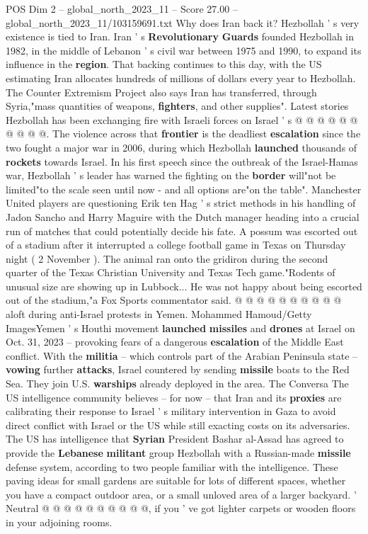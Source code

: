 \begin{textsample}{POS Dim 2 – global\_north\_2023\_11 – Score 27.00 – global\_north\_2023\_11/103159691.txt}
Why does Iran back it?
Hezbollah ' s very existence is tied to Iran.
Iran ' s \textbf{Revolutionary} \textbf{Guards} founded Hezbollah in 1982, in the middle of Lebanon ' s civil war between 1975 and 1990, to expand its influence in the \textbf{region}.
That backing continues to this day, with the US estimating Iran allocates hundreds of millions of dollars every year to Hezbollah.
The Counter Extremism Project also says Iran has transferred, through Syria,"mass quantities of weapons, \textbf{fighters}, and other supplies".
Latest stories Hezbollah has been exchanging fire with Israeli forces on Israel ' s @ @ @ @ @ @ @ @ @ @.
The violence across that \textbf{frontier} is the deadliest \textbf{escalation} since the two fought a major war in 2006, during which Hezbollah \textbf{launched} thousands of \textbf{rockets} towards Israel.
In his first speech since the outbreak of the Israel-Hamas war, Hezbollah ' s leader has warned the fighting on the \textbf{border} will"not be limited"to the scale seen until now - and all options are"on the table".
Manchester United players are questioning Erik ten Hag ' s strict methods in his handling of Jadon Sancho and Harry Maguire with the Dutch manager heading into a crucial run of matches that could potentially decide his fate.
A possum was escorted out of a stadium after it interrupted a college football game in Texas on Thursday night ( 2 November ).
The animal ran onto the gridiron during the second quarter of the Texas Christian University and Texas Tech game."Rodents of unusual size are showing up in Lubbock...
He was not happy about being escorted out of the stadium,"a Fox Sports commentator said. @ @ @ @ @ @ @ @ @ @ aloft during anti-Israel protests in Yemen.
Mohammed Hamoud/Getty ImagesYemen ' s Houthi movement \textbf{launched} \textbf{missiles} and \textbf{drones} at Israel on Oct. 31, 2023 -- provoking fears of a dangerous \textbf{escalation} of the Middle East conflict.
With the \textbf{militia} -- which controls part of the Arabian Peninsula state -- \textbf{vowing} further \textbf{attacks}, Israel countered by sending \textbf{missile} boats to the Red Sea.
They join U.S. \textbf{warships} already deployed in the area.
The Conversa The US intelligence community believes -- for now -- that Iran and its \textbf{proxies} are calibrating their response to Israel ' s military intervention in Gaza to avoid direct conflict with Israel or the US while still exacting costs on its adversaries.
The US has intelligence that \textbf{Syrian} President Bashar al-Assad has agreed to provide the \textbf{Lebanese} \textbf{militant} group Hezbollah with a Russian-made \textbf{missile} defense system, according to two people familiar with the intelligence.
These paving ideas for small gardens are suitable for lots of different spaces, whether you have a compact outdoor area, or a small unloved area of a larger backyard. ' Neutral @ @ @ @ @ @ @ @ @ @, if you ' ve got lighter carpets or wooden floors in your adjoining rooms.


\end{textsample}
